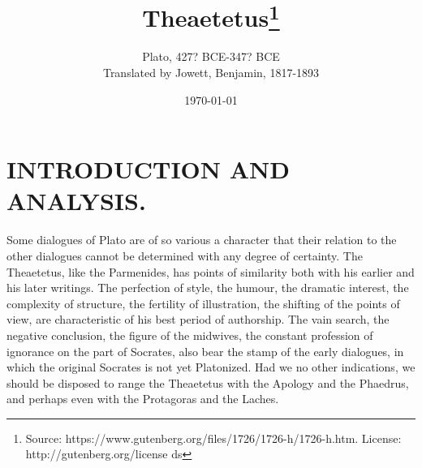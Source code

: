 \documentclass[11pt,letter]{article}
\begin{document}
\title{Theaetetus\thanks{Source: https://www.gutenberg.org/files/1726/1726-h/1726-h.htm. License: http://gutenberg.org/license ds}}
\date{\today}
\author{Plato, 427? BCE-347? BCE\\ Translated by Jowett, Benjamin, 1817-1893}
\maketitle

\setcounter{tocdepth}{1}
\tableofcontents
\renewcommand{\baselinestretch}{1.0}
\normalsize
\newpage

\section{
      INTRODUCTION AND ANALYSIS.
    }
\par  Some dialogues of Plato are of so various a character that their relation to the other dialogues cannot be determined with any degree of certainty. The Theaetetus, like the Parmenides, has points of similarity both with his earlier and his later writings. The perfection of style, the humour, the dramatic interest, the complexity of structure, the fertility of illustration, the shifting of the points of view, are characteristic of his best period of authorship. The vain search, the negative conclusion, the figure of the midwives, the constant profession of ignorance on the part of Socrates, also bear the stamp of the early dialogues, in which the original Socrates is not yet Platonized. Had we no other indications, we should be disposed to range the Theaetetus with the Apology and the Phaedrus, and perhaps even with the Protagoras and the Laches.
\end{document}
